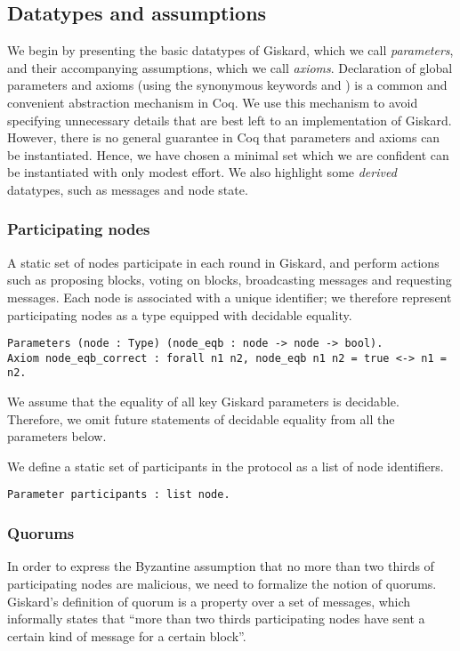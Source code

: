 \documentclass{easychair}
\begin{document}
\subsection{Datatypes and assumptions}
We begin by presenting the basic datatypes of Giskard, which we call \emph{parameters}, and their accompanying assumptions, which we call \emph{axioms}. Declaration of global parameters and axioms (using the synonymous keywords  and ) is a common and convenient abstraction mechanism in Coq. We use this mechanism to avoid specifying unnecessary details that are best left to an implementation of Giskard. However, there is no general guarantee in Coq that parameters and axioms can be instantiated. Hence, we have chosen a minimal set which we are confident can be instantiated with only modest effort. We also highlight some \emph{derived} datatypes, such as messages and node state.

\subsubsection{Participating nodes} 
A static set of nodes participate in each round in Giskard, and perform actions such as proposing blocks, voting on blocks, broadcasting messages and requesting messages.
Each node is associated with a unique identifier; we therefore represent participating nodes as a type equipped with decidable equality.

\begin{lstlisting}[language=Coq]
Parameters (node : Type) (node_eqb : node -> node -> bool).
Axiom node_eqb_correct : forall n1 n2, node_eqb n1 n2 = true <-> n1 = n2.
\end{lstlisting}

We assume that the equality of all key Giskard parameters is decidable. Therefore, we omit future statements of decidable equality from all the parameters below. 

We define a static set of participants in the protocol as a list of node identifiers.
\begin{lstlisting}[language=Coq]
Parameter participants : list node. 
\end{lstlisting}

\subsubsection{Quorums} 
In order to express the Byzantine assumption that no more than two thirds of participating nodes are malicious, we need to formalize the notion of quorums. Giskard's definition of quorum is a property over a set of messages, which informally states that ``more than two thirds participating nodes have sent a certain kind of message for a certain block''. 
\end{document}
